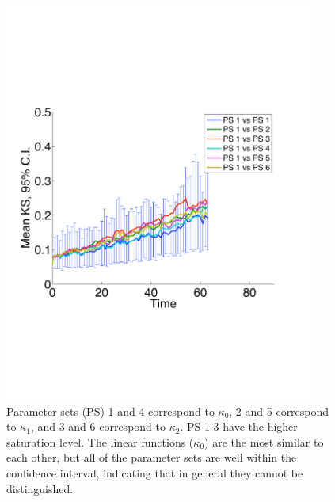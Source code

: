 \documentclass[12pt]{article}
\begin{document}
\begin{figure}[htp]
\begin{center}
	\includegraphics[width=4.0in]{figures/kappacomparisons} 
\end{center}
\caption{Parameter sets (PS) 1 and 4 correspond to $\kappa_0$, 2 and 5 correspond to $\kappa_1$, and 3 and 6 correspond to $\kappa_2$. PS 1-3 have the higher saturation level. The linear functions ($\kappa_0$) are the most similar to each other, but all of the parameter sets are well within the confidence interval, indicating that in general they cannot be distinguished.}
\label{fig:kappa}
\end{figure}





	
\newpage
\end{document}

